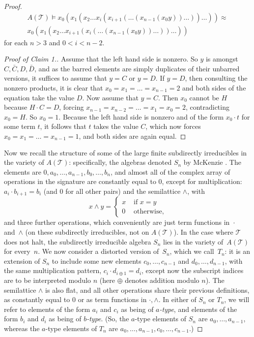\documentclass[reqno]{amsart}
\theoremstyle{plain}
\theoremstyle{definition}
\begin{document}
\begin{proof}
\begin{multline*}
A(\mathcal{T})\models x_0(x_1(x_2\dots x_i(x_{i+1}(\dots (x_{n-1}(x_0y))\dots))\dots))\approx\\ 
x_0(x_1(x_2\dots x_{i+1}(x_i(\dots (x_{n-1}(x_0y))\dots))\dots))
\end{multline*} for each $n>3$ and $0<i<n-2$.
\begin{proof}[Proof of Claim 1.]
Assume that the left hand side is nonzero.  So $y$ is amongst $C,\bar{C},D,\bar{D}$, and as the barred elements are simply duplicates of their unbarred versions, it suffices to assume that $y=C$ or $y=D$.  If $y=D$, then consulting the nonzero products, it is clear that $x_0=x_1=\dots=x_{n-1}=2$ and both sides of the equation take the value $D$.  Now assume that $y=C$.  Then $x_0$ cannot be $H$ because $H\cdot C=D$, forcing $x_{n-1}=x_{n-2}=\dots=x_1=x_0=2$, contradicting $x_0=H$.  So $x_0=1$.  Because the left hand side is nonzero and of the form $x_0\cdot t$ for some term $t$, it follows that $t$ takes the value $C$, which now forces $x_0=x_1=\dots=x_{n-1}=1$, and both sides are again equal.
\end{proof}
Now we recall the structure of some of the large finite subdirectly irreducibles in the variety of $A(\mathcal{T})$: specifically, the algebras denoted  $S_n$ by McKenzie \cite[Definition 4.1]{mck2}.  The elements are $0,a_0,\dots,a_{n-1},b_0,\dots,b_n$, and almost all of the complex array of operations in the signature are constantly equal to $0$, except for multiplication: $a_i\cdot b_{i+1}=b_i$ (and $0$ for all other pairs) and the semilattice $\wedge$, with 
\[
x\wedge y=\begin{cases}
x&\text{ if $x=y$}\\
0&\text{ otherwise,}
\end{cases}
\]
and three further operations, which conveniently are just term functions in~$\cdot$ and~$\wedge$ (on these subdirectly irreducibles, not on $A(\mathcal{T})$).  In the case where $\mathcal{T}$ does not halt, the subdirectly irreducible algebra $S_n$ lies in the variety of~$A(\mathcal{T})$ for every~$n$.  We now consider a distorted version of~$S_n$, which we call~$T_n$: it is an extension of $S_n$ to include some new elements $c_0,\dots,c_{n-1}$ and $d_0,\dots,d_{n-1}$, with the same multiplication pattern, $c_i\cdot d_{i\oplus 1}=d_i$, except now the subscript indices are to be interpreted modulo $n$ (here $\oplus$ denotes addition modulo $n$).  The semilattice $\wedge$ is also flat, and all other operations share their previous definitions, as constantly equal to $0$ or as term functions in $\cdot,\wedge$.  
In either of $S_n$ or $T_n$, we will refer to elements of the form $a_i$ and $c_i$ as being of \emph{$a$-type}, and elements of the form $b_i$ and $d_i$ as being of \emph{$b$-type}.  (So, the $a$-type elements of $S_n$ are $a_0,\dots,a_{n-1}$, whereas the $a$-type elements of $T_n$ are $a_0,\dots,a_{n-1},c_0,\dots,c_{n-1}$.)
\medskip


\end{proof}
\end{document}
